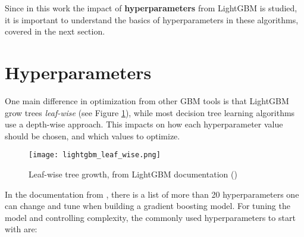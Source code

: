 Since in this work the impact of \textbf{hyperparameters} from LightGBM is studied, it is important to understand the basics of hyperparameters in these algorithms, covered in the next section.

\section{Hyperparameters}
\label{gbm-hyperparams}

One main difference in optimization from other GBM tools is that LightGBM grow trees \textit{leaf-wise} (see Figure \ref{fig:lightgbm-grow}), while most decision tree learning algorithms use a depth-wise approach. This impacts on how each hyperparameter value should be chosen, and which values to optimize. 

\begin{figure}[!h]
    \centering
    \texttt{[image: lightgbm\_leaf\_wise.png]} 
    \caption{Leaf-wise tree growth, from LightGBM documentation (\cite{lightgbmparams})}
    \label{fig:lightgbm-grow} 
  \end{figure}

In the documentation from \cite{lightgbmparams}, there is a list of more than 20 hyperparameters one can change and tune when building a gradient boosting model. For tuning the model and controlling complexity, the commonly used hyperparameters to start with are:

